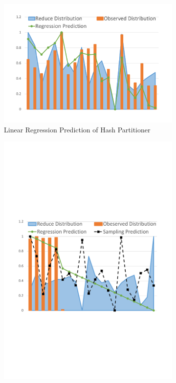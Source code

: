 \begin{figure}
	\centering
	\begin{subfigure}[b]{0.32\linewidth}
		\includegraphics[width=\linewidth]{fig/hash_pre}
		\caption{Linear Regression Prediction of Hash Partitioner}
		\label{fig:hash_pre}
	\end{subfigure}
	\begin{subfigure}[b]{0.32\linewidth}
		\includegraphics[width=\linewidth]{fig/range_pre_sample}

\end{subfigure}
\end{figure}
